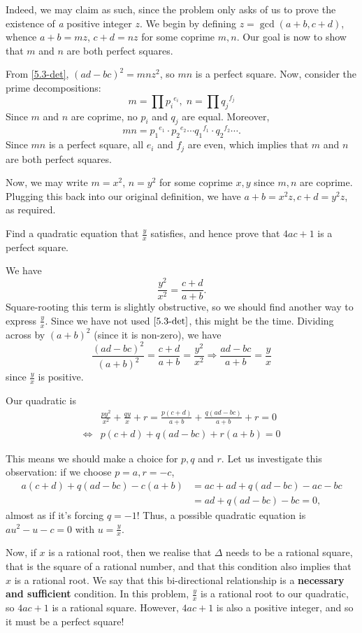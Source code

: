 \documentclass[../main.tex]{subfiles}
\begin{document}
Indeed, we may claim as such, since the problem only asks of us to prove the existence of \textit{a} positive integer $z$. We begin by defining $z=\gcd(a+b, c+d)$, whence $a+b=mz$, $c+d=nz$ for some coprime $m, n$. Our goal is now to show that $m$ and $n$ are both perfect squares.

From \eqref{5.3-det}, $(ad-bc)^2=mnz^2$, so $mn$ is a perfect square. Now, consider the prime decompositions:
    $$m = \prod {p_i}^{e_i}, \;n = \prod {q_j}^{f_j}$$
Since $m$ and $n$ are coprime, no $p_i$ and $q_j$ are equal.
Moreover,
$$mn = {p_1}^{e_1}\cdot{p_2}^{e_2}\cdots{q_1}^{f_1}\cdot{q_2}^{f_2}\cdots.$$
Since $mn$ is a perfect square, all $e_i$ and $f_j$ are even, which implies that $m$ and $n$ are both perfect squares.

Now, we may write $m=x^2$, $n=y^2$ for some coprime $x,y$ since $m, n$ are coprime. Plugging this back into our original definition, we have $a+b=x^2z, c+d=y^2z$, as required.
\newpage
\begin{example}[cont.]
Find a quadratic equation that $\frac{y}{x}$ satisfies, and hence prove that $4ac+1$ is a perfect square.
\end{example}
We have
$$\frac{y^2}{x^2}=\frac{c+d}{a+b}.$$
Square-rooting this term is slightly obstructive, so we should find another way to express $\frac{y}{x}$. Since we have not used $\eqref{5.3-det}$, this might be the time. Dividing across by $(a+b)^2$ (since it is non-zero), we have
$$\frac{(ad-bc)^2}{(a+b)^2}=\frac{c+d}{a+b}=\frac{y^2}{x^2} \Longrightarrow \frac{ad-bc}{a+b}=\frac{y}{x}$$
since $\frac{y}{x}$ is positive.

Our quadratic is
\begin{align*}
   &\frac{py^2}{x^2}+\frac{qy}{x}+r=\frac{p(c+d)}{a+b}+\frac{q(ad-bc)}{a+b}+r=0 \\
   \Longleftrightarrow &p(c+d)+q(ad-bc)+r(a+b)=0
\end{align*}

This means we should make a choice for $p, q$ and $r$. Let us investigate this observation: if we choose $p=a, r=-c$,
\begin{align*}
    a(c+d)+q(ad-bc)-c(a+b)&=ac+ad+q(ad-bc)-ac-bc\\
    &=ad+q(ad-bc)-bc=0,
\end{align*}
almost as if it's forcing $q=-1$!
Thus, a possible quadratic equation is $au^2-u-c=0$ with $u=\frac{y}{x}$.

Now, if $x$ is a rational root, then we realise that $\Delta$ needs to be a rational square, that is the square of a rational number, and that this condition also implies that $x$ is a rational root. We say that this bi-directional relationship is a \textbf{necessary and sufficient} condition. In this problem, $\frac{y}{x}$ is a rational root to our quadratic, so $4ac+1$ is a rational square. However, $4ac+1$ is also a positive integer, and so it must be a perfect square!
\end{document}

